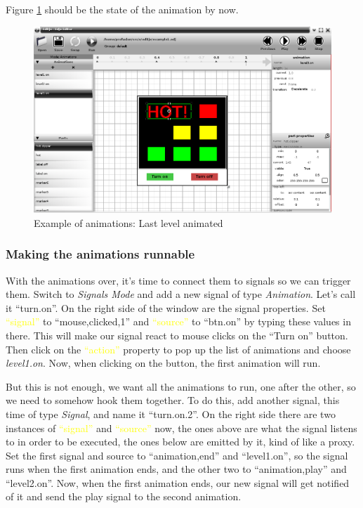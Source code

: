 \documentclass[a4paper]{profusion}
\newcommand{\GUIEditable}[1]{\textcolor{yellow}{#1}} %
\begin{document}
Figure \ref{fig:anim1_level3} should be the state of the animation by
now.

\begin{figure}[h!]
  \centering
  \includegraphics[width=1.0\textwidth]{examples/anim1_level3.png}
  \caption{Example of animations: Last level animated}
  \label{fig:anim1_level3}
\end{figure}

  \subsubsection{Making the animations runnable}

With the animations over, it's time to connect them to signals so we
can trigger them. Switch to \emph{Signals Mode} and add a new signal
of type \emph{Animation}. Let's call it ``turn.on''. On the right side
of the window are the signal properties. Set \GUIEditable{``signal''}
to ``mouse,clicked,1'' and \GUIEditable{``source''} to ``btn.on'' by
typing these values in there. This will make our signal react to mouse
clicks on the ``Turn on'' button. Then click on the
\GUIEditable{``action''} property to pop up the list of animations and
choose \emph{level1.on}. Now, when clicking on the button, the first
animation will run.

But this is not enough, we want all the animations to run, one after
the other, so we need to somehow hook them together. To do this, add
another signal, this time of type \emph{Signal}, and name it
``turn.on.2''. On the right side there are two instances of
\GUIEditable{``signal''} and \GUIEditable{``source''} now, the ones
above are what the signal listens to in order to be executed, the ones
below are emitted by it, kind of like a proxy. Set the first signal
and source to ``animation,end'' and ``level1.on'', so the signal runs
when the first animation ends, and the other two to ``animation,play''
and ``level2.on''. Now, when the first animation ends, our new signal
will get notified of it and send the play signal to the second
animation.
\end{document}
